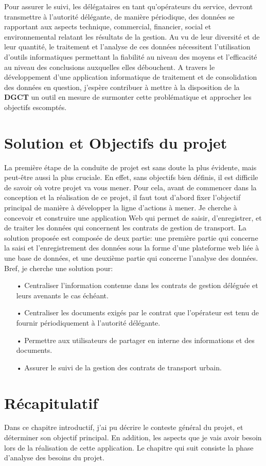 Pour assurer le suivi, les délégataires en tant qu’opérateurs du service, devront transmettre à l’autorité délégante, de manière périodique, des données se rapportant aux aspects technique, commercial, financier, social et environnemental relatant les résultats de la gestion. Au vu de leur diversité et de leur quantité, le traitement et l’analyse de ces données nécessitent l’utilisation d’outils informatiques permettant la fiabilité au niveau des moyens et l’efficacité au niveau des conclusions auxquelles elles débouchent. A travers le développement d’une application informatique de traitement et de consolidation des données en question, j’espère contribuer à mettre à la disposition de la \textbf{DGCT} un outil en mesure de surmonter cette problématique et approcher les objectifs escomptés.

\section{Solution et Objectifs du projet}

La première étape de la conduite de projet est sans doute la plus évidente,
mais peut-être
aussi la plus cruciale. En effet, sans objectifs bien définis, il est
difficile de savoir où votre projet
va vous mener. Pour cela, avant de commencer dans la conception et la
réalisation de ce projet,
il faut tout d’abord fixer l’objectif principal de manière à développer la
ligne d’actions à mener.
Je cherche à concevoir et construire une application Web qui permet de
saisir, d'enregistrer,
et de traiter les données qui concernent les contrats de gestion de
transport. La
solution proposée est composée de deux partie: une première partie qui
concerne la
saisi et l'enregistrement des données sous la forme d'une plateforme web
liée à une base de données, et une deuxième partie qui concerne l'analyse des données.
Bref, je cherche une solution pour:
\begin{itemize}
	\item[•] Centraliser l’information contenue dans les contrats de gestion
	      déléguée et
	      leurs avenants le cas échéant.
	\item[•] Centraliser les documents exigés par le contrat que l’opérateur
	      est tenu de
	      fournir périodiquement à l’autorité délégante.
	\item[•] Permettre aux utilisateurs de partager en interne des
	      informations et des
	      documents.
	\item[•] Assurer le suivi de la gestion des contrats de transport urbain.
\end{itemize}
\section{Récapitulatif}
Dans ce chapitre introductif, j'ai pu décrire le conteste général du
projet, et
déterminer son objectif principal. En addition, les aspects que je vais
avoir besoin lors de la réalisation de cette application.
Le chapitre qui suit consiste la phase d'analyse des besoins du projet.
